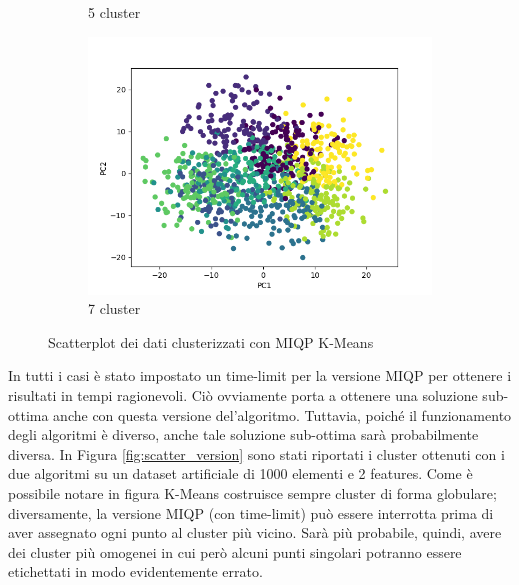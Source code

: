 \documentclass{article}
\begin{document}
\begin{figure}[h]
\begin{subfigure}[b]{0.32\linewidth}
         \caption{5 cluster}
     \end{subfigure}
     \begin{subfigure}[b]{0.32\linewidth}
         \centering
         \includegraphics[width=\linewidth]{../results/plots/scatter_k7}
         \caption{7 cluster}
     \end{subfigure}
     \caption{Scatterplot dei dati clusterizzati con MIQP K-Means}
     \label{fig:scatter_cluster}
    \end{figure}
    In tutti i casi è stato impostato un time-limit per la versione MIQP per ottenere i risultati in tempi ragionevoli. Ciò ovviamente porta a ottenere una soluzione sub-ottima anche con questa versione del'algoritmo. Tuttavia, poiché il funzionamento degli algoritmi è diverso, anche tale soluzione sub-ottima sarà probabilmente diversa. In Figura \ref{fig:scatter_version} sono stati riportati i cluster ottenuti con i due algoritmi su un dataset artificiale di 1000 elementi e 2 features. Come è possibile notare in figura K-Means costruisce sempre cluster di forma globulare; diversamente, la versione MIQP (con time-limit) può essere interrotta prima di aver assegnato ogni punto al cluster più vicino. Sarà più probabile, quindi, avere dei cluster più omogenei in cui però alcuni punti singolari potranno essere etichettati in modo evidentemente errato.
\end{document}
